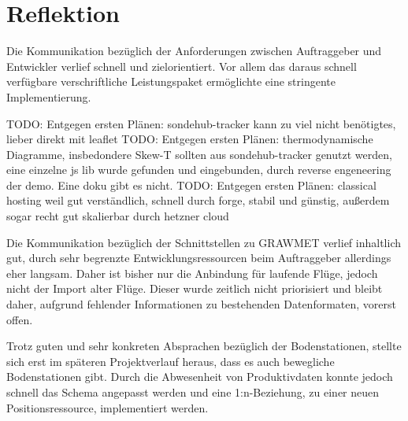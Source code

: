 \section{Reflektion}
Die Kommunikation bezüglich der Anforderungen zwischen Auftraggeber und Entwickler verlief schnell und zielorientiert.
Vor allem das daraus schnell verfügbare verschriftliche Leistungspaket ermöglichte eine stringente Implementierung.

TODO: Entgegen ersten Plänen: sondehub-tracker kann zu viel nicht benötigtes, lieber direkt mit leaflet
TODO: Entgegen ersten Plänen: thermodynamische Diagramme, insbedondere Skew-T sollten aus sondehub-tracker genutzt werden, eine einzelne js lib wurde gefunden und eingebunden, durch reverse engeneering der demo. Eine doku gibt es nicht.
TODO: Entgegen ersten Plänen: classical hosting weil gut verständlich, schnell durch forge, stabil und günstig, außerdem sogar recht gut skalierbar durch hetzner cloud

Die Kommunikation bezüglich der Schnittstellen zu GRAWMET verlief inhaltlich gut, durch sehr begrenzte Entwicklungsressourcen beim Auftraggeber allerdings eher langsam.
Daher ist bisher nur die Anbindung für laufende Flüge, jedoch nicht der Import alter Flüge.
Dieser wurde zeitlich nicht priorisiert und bleibt daher, aufgrund fehlender Informationen zu bestehenden Datenformaten, vorerst offen.

Trotz guten und sehr konkreten Absprachen bezüglich der Bodenstationen, stellte sich erst im späteren Projektverlauf heraus, dass es auch bewegliche Bodenstationen gibt.
Durch die Abwesenheit von Produktivdaten konnte jedoch schnell das Schema angepasst werden und eine 1:n-Beziehung, zu einer neuen Positionsressource, implementiert werden.
